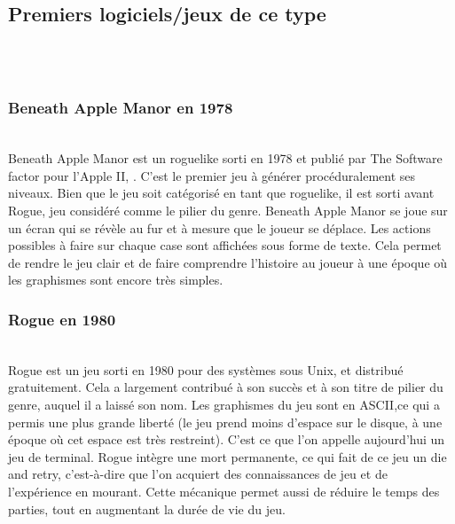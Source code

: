 \documentclass[12pt,a4paper]{article}
\begin{document}
\subsection{\textbf{Premiers logiciels/jeux de ce type}}
\\
\vspace*{.1cm}
\\
\normalsize{\subsubsection{Beneath Apple Manor en 1978}}
\\
Beneath Apple Manor est un roguelike sorti en 1978 et publié par The Software factor pour l’Apple II, . C’est le premier jeu à générer procéduralement ses niveaux. Bien que le jeu soit catégorisé en tant que roguelike, il est sorti avant Rogue, jeu considéré comme le pilier du genre. Beneath Apple Manor se joue sur un écran qui se révèle au fur et à mesure que le joueur se déplace. Les actions possibles à faire sur chaque case sont affichées sous forme de texte. Cela permet de rendre le jeu clair et de faire comprendre l’histoire au joueur à une époque où les graphismes sont encore très simples. 
\\
\newpage
\vspace*{.1cm}
\normalsize{\subsubsection{Rogue en 1980}}
\\
Rogue est un jeu sorti en 1980 pour des systèmes sous Unix, et distribué gratuitement. Cela a largement contribué à son succès et à son titre de pilier du genre, auquel il a laissé son nom. Les graphismes du jeu sont en ASCII,ce qui a permis une plus grande liberté (le jeu prend moins d'espace sur le disque, à une époque où cet espace est très restreint). C’est ce que l'on appelle aujourd’hui un jeu de terminal. Rogue intègre une mort permanente, ce qui fait de ce jeu un die and retry, c’est-à-dire que l'on acquiert des connaissances de jeu et de l’expérience en mourant. Cette mécanique permet aussi de réduire le temps des parties, tout en augmentant la durée de vie du jeu. 
\\

\vspace*{1mm}
\end{document}
